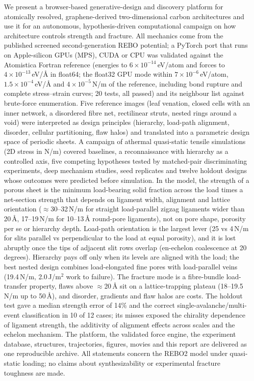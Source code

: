 We present a browser-based generative-design and discovery platform for atomically resolved, graphene-derived two-dimensional carbon architectures and use it for an autonomous, hypothesis-driven computational campaign on how architecture controls strength and fracture. All mechanics come from the published screened second-generation REBO potential; a PyTorch port that runs on Apple-silicon GPUs (MPS), CUDA or CPU was validated against the Atomistica Fortran reference (energies to $6\times10^{-14}$\,eV/atom and forces to $4\times10^{-13}$\,eV/\AA{} in float64; the float32 GPU mode within $7\times10^{-6}$\,eV/atom, $1.5\times10^{-4}$\,eV/\AA{} and $4\times10^{-5}$\,N/m of the reference, including bond rupture and complete stress--strain curves; 20 tests, all passed) and its neighbour list against brute-force enumeration. Five reference images (leaf venation, closed cells with an inner network, a disordered fibre net, rectilinear struts, nested rings around a void) were interpreted as design principles (hierarchy, load-path alignment, disorder, cellular partitioning, flaw halos) and translated into a parametric design space of periodic sheets. A campaign of \nRuns{} athermal quasi-static tensile simulations (2D stress in N/m) covered baselines, a reconnaissance with hierarchy as a controlled axis, five competing hypotheses tested by matched-pair discriminating experiments, deep mechanism studies, seed replicates and twelve holdout designs whose outcomes were predicted before simulation. In the model, the strength of a porous sheet is the minimum load-bearing solid fraction across the load times a net-section strength that depends on ligament width, alignment and lattice orientation ($\approx$30--32\,N/m for straight load-parallel zigzag ligaments wider than 20\,\AA, 17--19\,N/m for 10--13\,\AA{} round-pore ligaments), not on pore shape, porosity per se or hierarchy depth. Load-path orientation is the largest lever (25 vs 4\,N/m for slits parallel vs perpendicular to the load at equal porosity), and it is lost abruptly once the tips of adjacent slit rows overlap (en-echelon coalescence at 20 degrees). Hierarchy pays off only when its levels are aligned with the load; the best nested design combines load-elongated fine pores with load-parallel veins (19.4\,N/m, 2.0\,J/m$^2$ work to failure). The fracture mode is a fibre-bundle load-transfer property, flaws above $\approx$20\,\AA{} sit on a lattice-trapping plateau (18--19.5\,N/m up to 50\,\AA), and disorder, gradients and flaw halos are costs. The holdout test gave a median strength error of 14\% and the correct single-avalanche/multi-event classification in 10 of 12 cases; its misses exposed the chirality dependence of ligament strength, the additivity of alignment effects across scales and the echelon mechanism. The platform, the validated force engine, the experiment database, structures, trajectories, figures, movies and this report are delivered as one reproducible archive. All statements concern the REBO2 model under quasi-static loading; no claims about synthesizability or experimental fracture toughness are made.
